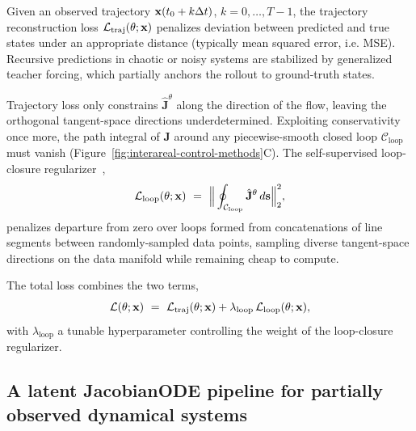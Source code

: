  Given an observed trajectory $\vb{x}(t_0 + k\Delta t)$, $k=0,\dots,T-1$, the trajectory reconstruction loss $\mathcal{L}_{\mathrm{traj}}(\theta;\vb{x})$ penalizes deviation between predicted and true states under an appropriate distance (typically mean squared error, i.e. MSE). Recursive predictions in chaotic or noisy systems are stabilized by generalized teacher forcing, which partially anchors the rollout to ground-truth states.\cite{Hess2023-kp}

 Trajectory loss only constrains $\hat{\mathbf{J}}^{\theta}$ along the direction of the flow, leaving the orthogonal tangent-space directions underdetermined. Exploiting conservativity once more, the path integral of $\mathbf{J}$ around any piecewise-smooth closed loop $\mathcal{C}_{\mathrm{loop}}$ must vanish (Figure~\ref{fig:interareal-control-methods}C). The self-supervised loop-closure regularizer~\cite{Iyer2024-kk},
\begin{equation}
\mathcal{L}_{\mathrm{loop}}(\theta;\vb{x}) \ =\ \Big\|\oint_{\mathcal{C}_{\mathrm{loop}}}\hat{\mathbf{J}}^{\theta}\, d\vb{s}\Big\|_2^{2},
\label{eq:interareal-control-loopclosure}
\end{equation}
penalizes departure from zero over loops formed from concatenations of line segments between randomly-sampled data points, sampling diverse tangent-space directions on the data manifold while remaining cheap to compute.

 The total loss combines the two terms,
\begin{equation}
\mathcal{L}(\theta;\vb{x}) \ =\ \mathcal{L}_{\mathrm{traj}}(\theta;\vb{x}) + \lambda_{\mathrm{loop}}\,\mathcal{L}_{\mathrm{loop}}(\theta;\vb{x}),
\label{eq:interareal-control-jacobianode-loss}
\end{equation}
with $\lambda_{\mathrm{loop}}$ a tunable hyperparameter controlling the weight of the loop-closure regularizer.

\subsection{A latent JacobianODE pipeline for partially observed dynamical systems}

